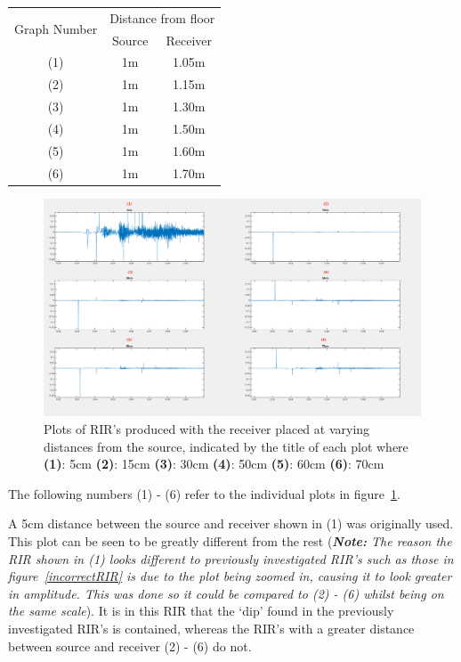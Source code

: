 \documentclass[../../main.tex]{subfiles}
\begin{document}
			 \begin{center}
				 \begin{tabular}{|c |c| c|}
				 \hline
				 \multirow{2}{*}{Graph Number} & \multicolumn{2}{|c|}{Distance from floor} \\ \cline{2-3}
				 & Source & Receiver \\\hline
				 (1) & 1m & 1.05m \\
				 (2) & 1m & 1.15m \\
				 (3) & 1m & 1.30m \\
				 (4) & 1m & 1.50m \\
				 (5) & 1m & 1.60m \\
				 (6) & 1m & 1.70m \\ \hline
				 \end{tabular}
			 \end{center}
			 \vspace{5mm}
			\begin{figure}[h]
				\centerline{\includegraphics[scale = 0.32]{Sections/Implementation/Odeon/images/incorrectRIR/HeightTest_Edit.png}}
				\caption{Plots of \ac{RIR}'s produced with the receiver placed at varying distances from the source, indicated by the title of each plot where \textbf{(1)}: 5cm \textbf{(2)}: 15cm \textbf{(3)}: 30cm \textbf{(4)}: 50cm \textbf{(5)}: 60cm \textbf{(6)}: 70cm}
				\label{HeightTest}
			\end{figure}

			The following numbers (1) - (6) refer to the individual plots in figure~\ref{HeightTest}.

			A 5cm distance between the source and receiver shown in (1) was originally used. This plot can be seen to be greatly different from the rest (\textit{\textbf{Note:} The reason the \ac{RIR} shown in (1) looks different to previously investigated \ac{RIR}'s such as those in figure~\ref{incorrectRIR} is due to the plot being zoomed in, causing it to look greater in amplitude. This was done so it could be compared to (2) - (6) whilst being on the same scale}). It is in this \ac{RIR} that the `dip' found in the previously investigated \ac{RIR}'s is contained, whereas the \ac{RIR}'s with a greater distance between source and receiver (2) - (6) do not.
\end{document}
